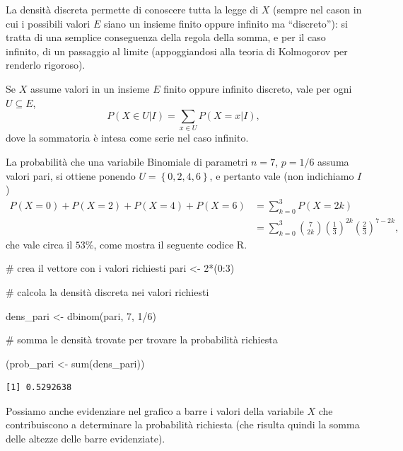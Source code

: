 \documentclass[
  italian,
  letterpaper,
]{book}
\newenvironment{Shaded}{\begin{snugshade}}{\end{snugshade}}
\newcommand{\CommentTok}[1]{\textcolor[rgb]{0.37,0.37,0.37}{#1}}
\newcommand{\DecValTok}[1]{\textcolor[rgb]{0.68,0.00,0.00}{#1}}
\newcommand{\FunctionTok}[1]{\textcolor[rgb]{0.28,0.35,0.67}{#1}}
\newcommand{\NormalTok}[1]{\textcolor[rgb]{0.00,0.23,0.31}{#1}}
\newcommand{\OtherTok}[1]{\textcolor[rgb]{0.00,0.23,0.31}{#1}}
\newcommand{\SpecialCharTok}[1]{\textcolor[rgb]{0.37,0.37,0.37}{#1}}
\newcommand{\bra}[1]{\left( #1 \right)}
\newcommand{\cur}[1]{\left\{ #1 \right\}}
\theoremstyle{definition}
\theoremstyle{remark}
\begin{document}
La densità discreta permette di conoscere tutta la legge di \(X\)
(sempre nel cason in cui i possibili valori \(E\) siano un insieme
finito oppure infinito ma ``discreto''): si tratta di una semplice
conseguenza della regola della somma, e per il caso infinito, di un
passaggio al limite (appoggiandosi alla teoria di Kolmogorov per
renderlo rigoroso).

Se \(X\) assume valori in un insieme \(E\) finito oppure infinito
discreto, vale per ogni \(U \subseteq E\),
\[ P(X \in U|I) = \sum_{x \in U} P(X = x |I),\] dove la sommatoria è
intesa come serie nel caso infinito.

La probabilità che una variabile Binomiale di parametri \(n=7\),
\(p=1/6\) assuma valori pari, si ottiene ponendo \(U = \cur{0,2,4,6}\),
e pertanto vale (non indichiamo \(I\))
\[  \begin{split} P(X=0)+P(X=2)+ P(X=4)+P(X=6)  & = \sum_{k=0}^3 P(X = 2k)\\
& = \sum_{k=0}^3 {7 \choose 2k} \bra{\frac 1 3}^{2k} \bra{\frac 2 3 }^{7 - 2k},\end{split}\]
che vale circa il \(53\%\), come mostra il seguente codice R.

\begin{Shaded}
\begin{Highlighting}[]
\CommentTok{\# crea il vettore con i valori richiesti }
\NormalTok{pari }\OtherTok{\textless{}{-}} \DecValTok{2}\SpecialCharTok{*}\NormalTok{(}\DecValTok{0}\SpecialCharTok{:}\DecValTok{3}\NormalTok{)}

\CommentTok{\# calcola la densità discreta nei valori richiesti}

\NormalTok{dens\_pari }\OtherTok{\textless{}{-}} \FunctionTok{dbinom}\NormalTok{(pari, }\DecValTok{7}\NormalTok{, }\DecValTok{1}\SpecialCharTok{/}\DecValTok{6}\NormalTok{)}

\CommentTok{\# somma le densità trovate per trovare la probabilità richiesta}

\NormalTok{(prob\_pari }\OtherTok{\textless{}{-}} \FunctionTok{sum}\NormalTok{(dens\_pari))}
\end{Highlighting}
\end{Shaded}

\begin{verbatim}
[1] 0.5292638
\end{verbatim}

Possiamo anche evidenziare nel grafico a barre i valori della variabile
\(X\) che contribuiscono a determinare la probabilità richiesta (che
risulta quindi la somma delle altezze delle barre evidenziate).
\end{document}
